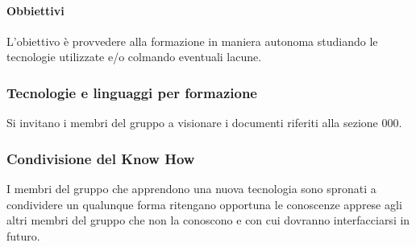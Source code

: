 			\paragraph{Obbiettivi}
				L'obiettivo è provvedere alla formazione in maniera autonoma studiando le tecnologie utilizzate e/o colmando eventuali lacune.
		\subsubsection{Tecnologie e linguaggi per formazione}
			Si invitano i membri del gruppo a visionare i documenti riferiti alla sezione 000.
		\subsubsection{Condivisione del Know How}
			I membri del gruppo che apprendono una nuova tecnologia sono spronati a condividere un qualunque forma ritengano opportuna le conoscenze apprese agli altri membri del gruppo che non la conoscono e con cui dovranno interfacciarsi in futuro.




			
			
			
			
			
			
			
			
			
			
			
			
			
			
			
			